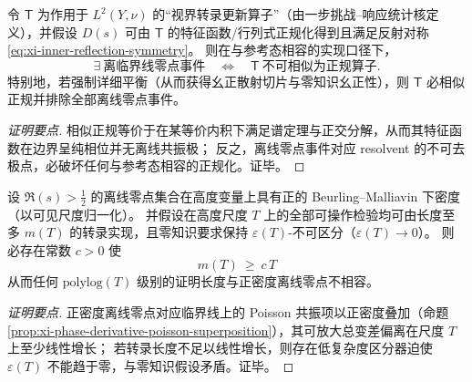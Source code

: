 \begin{proposition}\label{prop:xi-nonnormality-obstruction-offcritical}
令 \(\mathsf{T}\) 为作用于 \(L^2(Y,\nu)\) 的“视界转录更新算子”（由一步挑战–响应统计核定义），并假设 \(D(s)\) 可由 \(\mathsf{T}\) 的特征函数/行列式正规化得到且满足反射对称 \eqref{eq:xi-inner-reflection-symmetry}。
则在与参考态相容的实现口径下，
\[
\boxed{\;
\exists\ \text{离临界线零点事件}\quad\Longleftrightarrow\quad
\mathsf{T}\ \text{不可相似为正规算子}. \;}
\]
特别地，若强制详细平衡（从而获得幺正散射切片与零知识幺正性），则 \(\mathsf{T}\) 必相似正规并排除全部离线零点事件。
\end{proposition}
\begin{proof}[证明要点]
相似正规等价于在某等价内积下满足谱定理与正交分解，从而其特征函数在边界呈纯相位并无离线共振极；
反之，离线零点事件对应 resolvent 的不可去极点，必破坏任何与参考态相容的正规化。证毕。
\end{proof}

\begin{proposition}\label{prop:xi-bm-density-forces-linear-transcript-length}
设 \(\Re(s)>\tfrac12\) 的离线零点集合在高度变量上具有正的 Beurling--Malliavin 下密度（以可见尺度归一化）。
并假设在高度尺度 \(T\) 上的全部可操作检验均可由长度至多 \(m(T)\) 的转录实现，且零知识要求保持 \(\varepsilon(T)\)-不可区分（\(\varepsilon(T)\to 0\)）。
则必存在常数 \(c>0\) 使
\[
\boxed{\; m(T)\ \ge\ c\,T\;}
\]
从而任何 \(\mathrm{polylog}(T)\) 级别的证明长度与正密度离线零点不相容。
\end{proposition}
\begin{proof}[证明要点]
正密度离线零点对应临界线上的 Poisson 共振项以正密度叠加（命题 \ref{prop:xi-phase-derivative-poisson-superposition}），其可放大总变差偏离在尺度 \(T\) 上至少线性增长；
若转录长度不足以线性增长，则存在低复杂度区分器迫使 \(\varepsilon(T)\) 不能趋于零，与零知识假设矛盾。证毕。
\end{proof}

\endinput

